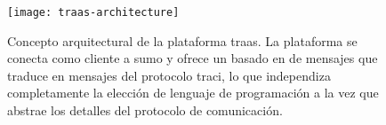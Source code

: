 \begin{figure}
	\centering
	\texttt{[image: traas-architecture]}
	\caption[Arquitectura de la plataforma \gls{traas}]{Concepto arquitectural de la plataforma \gls{traas}. La plataforma se conecta como cliente a \gls{sumo} y ofrece un  basado en  de mensajes que traduce en mensajes del protocolo \gls{traci}, lo que independiza completamente la elección de lenguaje de programación a la vez que abstrae los detalles del protocolo de comunicación.}
	\label{fig:traas}
\end{figure}
